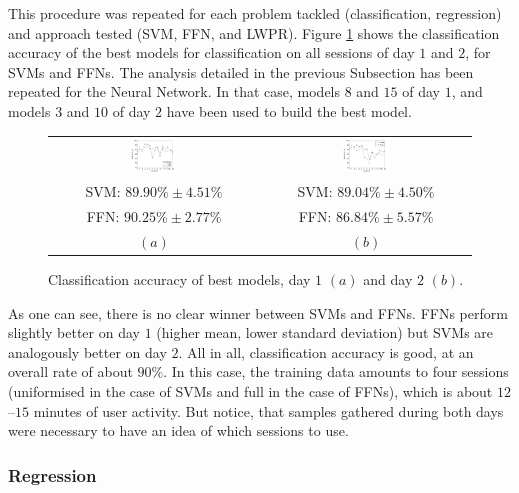 This procedure was repeated for each problem tackled (classification,
regression) and approach tested (SVM, FFN, and LWPR). Figure
\ref{fig:best_class} shows the classification accuracy of the best
models for classification on all sessions of day $1$ and $2$, for SVMs
and FFNs. The analysis detailed in the previous Subsection has been
repeated for the Neural Network. In that case, models $8$ and $15$ of
day $1$, and models $3$ and $10$ of day $2$ have been used to build
the best model.

\begin{figure}[!ht] \centering
  \begin{tabular}{cc}
    \includegraphics[width=0.23\textwidth]{figs/fig_class_resCrossBestOnDay1.png} &
    \includegraphics[width=0.23\textwidth]{figs/fig_class_resCrossBestOnDay2.png} \\
    SVM: $89.90\% \pm 4.51\%$ & SVM: $89.04\% \pm 4.50\%$ \\
    FFN: $90.25\% \pm 2.77\%$ & FFN: $86.84\% \pm 5.57\%$ \\
    $(a)$ & $(b)$ \\
  \end{tabular}
  \caption{Classification accuracy of best models, day $1$ $(a)$ and
    day $2$ $(b)$.}
  \label{fig:best_class}
\end{figure}

As one can see, there is no clear winner between SVMs and FFNs. FFNs
perform slightly better on day $1$ (higher mean, lower standard
deviation) but SVMs are analogously better on day $2$. All in all,
classification accuracy is good, at an overall rate of about
$90\%$. In this case, the training data amounts to four sessions
(uniformised in the case of SVMs and full in the case of FFNs), which
is about $12$--$15$ minutes of user activity. But notice, that samples
gathered during both days were necessary to have an idea of which
sessions to use.

\subsubsection{Regression}

